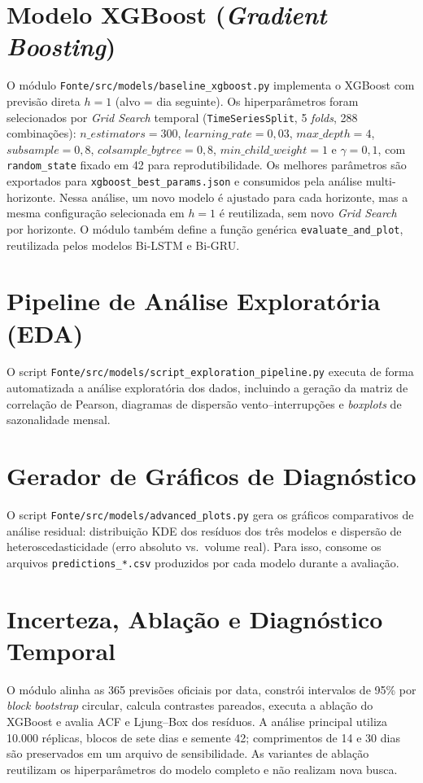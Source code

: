 \section{Modelo XGBoost (\textit{Gradient Boosting})}
O módulo \texttt{Fonte/src/models/baseline\_xgboost.py} implementa o XGBoost com previsão direta $h = 1$ (alvo = dia seguinte). Os hiperparâmetros foram selecionados por \textit{Grid Search} temporal (\texttt{TimeSeriesSplit}, 5 \textit{folds}, 288 combinações): $n\_estimators = 300$, $learning\_rate = 0{,}03$, $max\_depth = 4$, $subsample = 0{,}8$, $colsample\_bytree = 0{,}8$, $min\_child\_weight = 1$ e $\gamma = 0{,}1$, com \texttt{random\_state} fixado em 42 para reprodutibilidade. Os melhores parâmetros são exportados para \texttt{xgboost\_\-best\_\-params.json} e consumidos pela análise multi-horizonte. Nessa análise, um novo modelo é ajustado para cada horizonte, mas a mesma configuração selecionada em $h=1$ é reutilizada, sem novo \textit{Grid Search} por horizonte. O módulo também define a função genérica \texttt{evaluate\_\-and\_\-plot}, reutilizada pelos modelos Bi-LSTM e Bi-GRU.

\section{Pipeline de Análise Exploratória (EDA)}
O script \texttt{Fonte/src/models/script\_exploration\_pipeline.py} executa de forma automatizada a análise exploratória dos dados, incluindo a geração da matriz de correlação de Pearson, diagramas de dispersão vento--interrupções e \textit{boxplots} de sazonalidade mensal.

\section{Gerador de Gráficos de Diagnóstico}
O script \texttt{Fonte/src/models/advanced\_plots.py} gera os gráficos comparativos de análise residual: distribuição KDE dos resíduos dos três modelos e dispersão de heteroscedasticidade (erro absoluto vs.\ volume real). Para isso, consome os arquivos \texttt{predictions\_*.csv} produzidos por cada modelo durante a avaliação.

\section{Incerteza, Ablação e Diagnóstico Temporal}
O módulo  alinha as 365 previsões oficiais por data, constrói intervalos de 95\% por \textit{block bootstrap} circular, calcula contrastes pareados, executa a ablação do XGBoost e avalia ACF e Ljung--Box dos resíduos. A análise principal utiliza 10.000 réplicas, blocos de sete dias e semente 42; comprimentos de 14 e 30 dias são preservados em um arquivo de sensibilidade. As variantes de ablação reutilizam os hiperparâmetros do modelo completo e não realizam nova busca.

